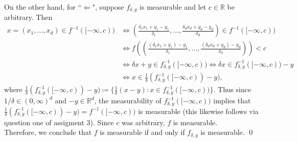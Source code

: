 \noindent On the other hand, for ``$\Leftarrow$", suppose \( f_{\delta ,y}  \) is measurable and let \( c \in \mathbb{R} \) be arbitrary. Then
\begin{align*}
x= (x_1, \hdots , x_d) \in f ^{-1} ([-\infty,c))  &\iff {\left ( {\frac{\delta_1 x_1 + y_1 - y_1}{\delta_1}, \hdots , \frac{\delta_d x_d + y_d - y_d}{\delta_d} } \right ) } \in f ^{-1} ([-\infty,c)) \\
					       &\iff f\left ( {\left ( \frac{(\delta_1 x_1 + y_1) - y_1}{\delta_1}, \hdots , \frac{(\delta_d x_d + y_d) - y_d}{\delta_d}   \right)} \right ) < c \\
					       &\iff \delta x + y \in f_{\delta ,y} ^{-1} ([-\infty,c)) \iff \delta x \in f_{\delta ,y} ^{-1} ([-\infty,c))  - y \\
					       &\iff x \in \frac{1}{\delta } (f_{\delta ,y} ^{-1} ([-\infty,c)) - y),
\end{align*}
where \( \frac{1}{\delta } (f_{\delta ,y} ^{-1} ([-\infty,c)) - y) \coloneqq \{ \frac{1}{\delta } (x-y) : x \in f_{\delta ,y} ^{-1} ([-\infty,c))  \}  \). Thus since \( 1/\delta \in (0,\infty)^{d}  \) and \( -y \in \mathbb{R}^{d}  \), the measurability of \( f_{\delta ,y} ^{-1} ([-\infty,c))  \) implies that \( \frac{1}{\delta } (f_{\delta ,y} ^{-1} ([-\infty,c)) - y) = f ^{-1} ([-\infty,c))   \) is measurable (this likewise follows via question one of assigment 3). Since \( c \) was arbitrary, \( f \) is measurable. \\

\noindent Therefore, we conclude that \( f \) is measurable if and only if \( f_{\delta ,y}  \) is measurable. \qed \\


